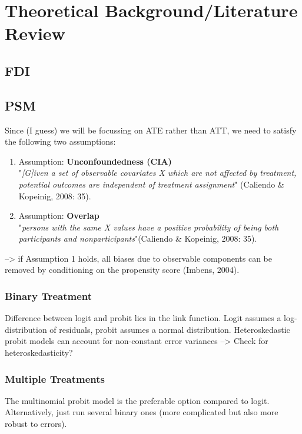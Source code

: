 \documentclass[a4paper,11pt]{scrartcl}
\begin{document}
\section{Theoretical Background/Literature Review}

\subsection{FDI}

\subsection{PSM}
Since (I guess) we will be focussing on ATE rather than ATT, we need to satisfy the following two assumptions: 

\begin{enumerate}
\item Assumption: \textbf{Unconfoundedness (CIA)} \\
"\textit{[G]iven a set of observable covariates X which are not affected by treatment, potential outcomes are independent of treatment assignment}" (Caliendo \& Kopeinig, 2008: 35).

\item Assumption: \textbf{Overlap} \\
"\textit{persons with the same X values have a positive probability of being both participants and nonparticipants}"(Caliendo \& Kopeinig, 2008: 35).

\end{enumerate}
--> if Assumption 1 holds, all biases due to observable components can be removed by conditioning on the propensity score (Imbens, 2004).

\subsubsection*{Binary Treatment}
Difference between logit and probit lies in the link function. Logit assumes a log-distribution of residuals, probit assumes a normal distribution. Heteroskedastic probit models can account for non-constant error variances --> Check for heteroskedasticity?

\subsubsection*{Multiple Treatments}
The multinomial probit model is the preferable option compared to logit. Alternatively, just run several binary ones (more complicated but also more robust to errors).
\end{document}
